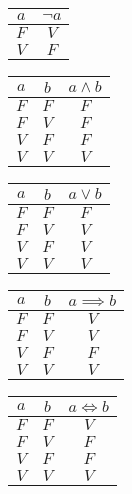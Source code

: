 \documentclass[12pt]{article}
\begin{document}
\begin{center}
	\begin{tabular}{|c|c|}
		\hline
		$a$ & $\neg a$\\ 
		\hline
		$F$ & $V$\\ 
		\hline
		$V$ & $F$\\ 
		\hline
\end{tabular}\end{center}
\begin{center}
	\begin{tabular}{|c|c|c|}
		\hline
		$a$ & $b$ & $a\wedge b$\\ 
		\hline
		$F$ & $F$ & $F$\\ 
		\hline
		$F$ & $V$ & $F$\\ 
		\hline
		$V$ & $F$ & $F$\\ 
		\hline
		$V$ & $V$ & $V$\\ 
		\hline
\end{tabular}\end{center}
\begin{center}
	\begin{tabular}{|c|c|c|}
		\hline
		$a$ & $b$ & $a\vee b$\\ 
		\hline
		$F$ & $F$ & $F$\\ 
		\hline
		$F$ & $V$ & $V$\\ 
		\hline
		$V$ & $F$ & $V$\\ 
		\hline
		$V$ & $V$ & $V$\\ 
		\hline
\end{tabular}\end{center}
\begin{center}
	\begin{tabular}{|c|c|c|}
		\hline
		$a$ & $b$ & $a\implies b$\\ 
		\hline
		$F$ & $F$ & $V$\\ 
		\hline
		$F$ & $V$ & $V$\\ 
		\hline
		$V$ & $F$ & $F$\\ 
		\hline
		$V$ & $V$ & $V$\\ 
		\hline
\end{tabular}\end{center}
\begin{center}
	\begin{tabular}{|c|c|c|}
		\hline
		$a$ & $b$ & $a\iff b$\\ 
		\hline
		$F$ & $F$ & $V$\\ 
		\hline
		$F$ & $V$ & $F$\\ 
		\hline
		$V$ & $F$ & $F$\\ 
		\hline
		$V$ & $V$ & $V$\\ 
		\hline
\end{tabular}\end{center}
\end{document}
